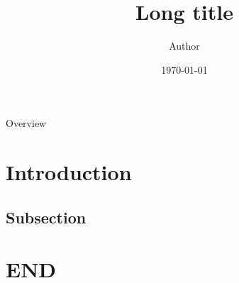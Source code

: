 \documentclass{beamer}
\title[Short title]{Long title}
\author[Author]
{   %
    Author\inst{1}
}
\institute[ULOYOLA]
{   %
    \begin{tabular}{c}
    \inst{1}Universidad Loyola Andaluc\'ia
    \end{tabular}
}
\date
{   %
	\today
}
\begin{document}
\frame{\titlepage}

\begin{frame}{Overview}
\tableofcontents
\end{frame}



\section{Introduction}
\subsection{Subsection}


%    
%	

\section*{END}
\end{document}
